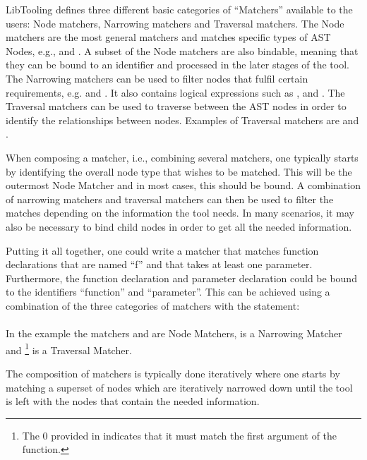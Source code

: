 LibTooling defines three different basic categories of ``Matchers'' available to the users: Node matchers, Narrowing matchers and Traversal matchers.
The Node matchers are the most general matchers and matches specific types of AST Nodes, e.g.,  and . A subset of the Node matchers are also bindable, meaning that they can be bound to an identifier and processed in the later stages of the tool.
The Narrowing matchers can be used to filter nodes that fulfil certain requirements, e.g.  and . It also contains logical expressions such as , and .
The Traversal matchers can be used to traverse between the AST nodes in order to identify the relationships between nodes.
Examples of Traversal matchers are  and  \cite{clangASTMatcherReference}.

When composing a matcher, i.e., combining several matchers, one typically starts by identifying the overall node type that wishes to be matched. This will be the outermost Node Matcher and in most cases, this should be bound.
A combination of narrowing matchers and traversal matchers can then be used to filter the matches depending on the information the tool needs.
In many scenarios, it may also be necessary to bind child nodes in order to get all the needed information.

Putting it all together, one could write a matcher that matches function declarations that are named ``f'' and that takes at least one parameter. Furthermore, the function declaration and parameter declaration could be bound to the identifiers ``function'' and ``parameter''.
This can be achieved using a combination of the three categories of matchers with the statement:\\ \\
In the example the matchers  and  are Node Matchers,  is a Narrowing Matcher and \footnote{The 0 provided in  indicates that it must match the first argument of the function.} is a Traversal Matcher.

The composition of matchers is typically done iteratively where one starts by matching a superset of nodes which are iteratively narrowed down until the tool is left with the nodes that contain the needed information. 

